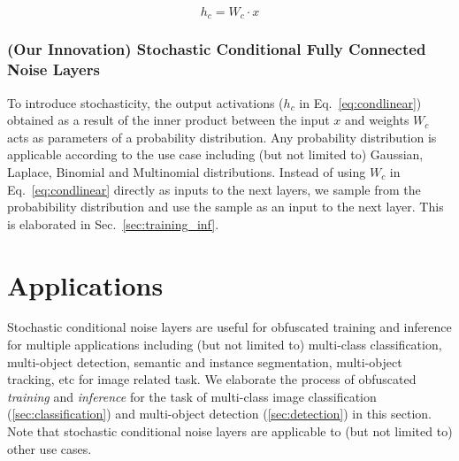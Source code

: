 \documentclass[12pt, letterpaper]{article}
\begin{document}
\begin{equation}
h_c=W_c \cdot x
    \label{eq:condlinear}
\end{equation}

\subsubsection{(Our Innovation) Stochastic Conditional Fully Connected Noise Layers}
\label{sec:stochasticcondfc}
To introduce stochasticity, the output activations ($h_c$ in Eq.~\eqref{eq:condlinear}) obtained as a result of the inner product between the input $x$ and weights $W_c$ acts as parameters of a probability distribution. 
Any probability distribution is applicable according to the use case including (but not limited to) Gaussian, Laplace, Binomial and Multinomial distributions.  
Instead of using $W_{c}$ in Eq.~\eqref{eq:condlinear} directly as inputs to the next layers, we sample from the probabibility distribution and use the sample as an input to the next layer. This is elaborated in Sec.~\ref{sec:training_inf}.


\section{Applications}
\label{sec:app}
Stochastic conditional noise layers are useful for obfuscated training and inference for multiple applications including (but not limited to) multi-class classification, multi-object detection, semantic and instance segmentation, multi-object tracking, etc for image related task. We elaborate the process of obfuscated \emph{training} and \emph{inference} for the task of multi-class image classification (\ref{sec:classification}) and multi-object detection (\ref{sec:detection}) in this section. Note that stochastic conditional noise layers are applicable to (but not limited to) other use cases.
\end{document}
